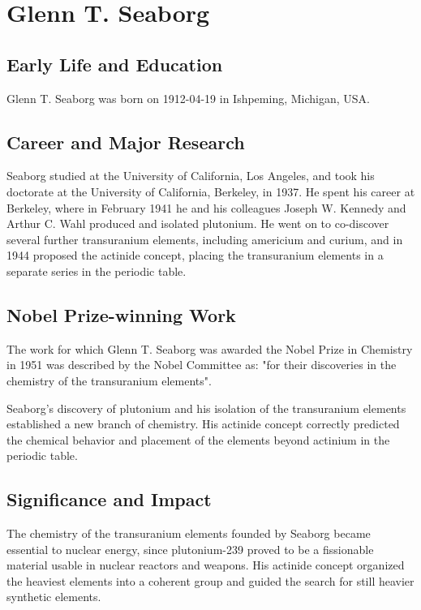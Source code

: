 \clearpage

\section{Glenn T. Seaborg}

\subsection*{Early Life and Education}

Glenn T. Seaborg was born on 1912-04-19 in Ishpeming, Michigan, USA.

\subsection*{Career and Major Research}

Seaborg studied at the University of California, Los Angeles, and took his doctorate at the University of California, Berkeley, in 1937. He spent his career at Berkeley, where in February 1941 he and his colleagues Joseph W. Kennedy and Arthur C. Wahl produced and isolated plutonium. He went on to co-discover several further transuranium elements, including americium and curium, and in 1944 proposed the actinide concept, placing the transuranium elements in a separate series in the periodic table.

\subsection*{Nobel Prize-winning Work}

The work for which Glenn T. Seaborg was awarded the Nobel Prize in Chemistry in 1951 was described by the Nobel Committee as: "for their discoveries in the chemistry of the transuranium elements".

Seaborg's discovery of plutonium and his isolation of the transuranium elements established a new branch of chemistry. His actinide concept correctly predicted the chemical behavior and placement of the elements beyond actinium in the periodic table.

\subsection*{Significance and Impact}

The chemistry of the transuranium elements founded by Seaborg became essential to nuclear energy, since plutonium-239 proved to be a fissionable material usable in nuclear reactors and weapons. His actinide concept organized the heaviest elements into a coherent group and guided the search for still heavier synthetic elements.

